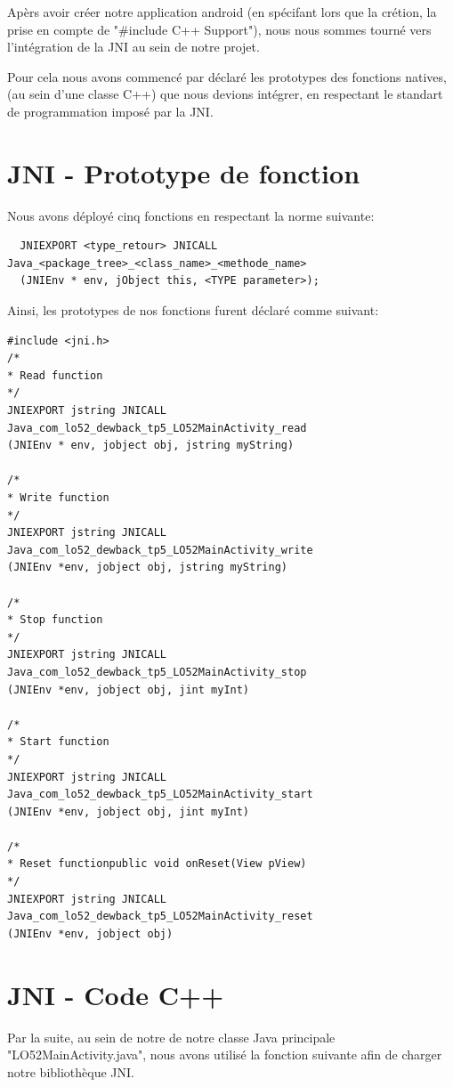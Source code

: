\documentclass[french,a4paper,12pt]{report}
\begin{document}
Apèrs avoir créer notre application android (en spécifant lors que la crétion,
la prise en compte de "#include C++ Support"), nous nous sommes tourné vers
l'intégration de la JNI au sein de notre projet.

Pour cela nous avons commencé par déclaré les prototypes des fonctions natives,
(au sein d'une classe C++) que nous devions intégrer, en respectant le standart
de programmation imposé par la JNI.

\section{JNI - Prototype de fonction}

Nous avons déployé cinq fonctions en respectant la norme suivante:

\begin{lstlisting}
  JNIEXPORT <type_retour> JNICALL Java_<package_tree>_<class_name>_<methode_name>
  (JNIEnv * env, jObject this, <TYPE parameter>);
\end{lstlisting}

Ainsi, les prototypes de nos fonctions furent déclaré comme suivant:

\begin{lstlisting}
#include <jni.h>
/*
* Read function
*/
JNIEXPORT jstring JNICALL Java_com_lo52_dewback_tp5_LO52MainActivity_read
(JNIEnv * env, jobject obj, jstring myString)

/*
* Write function
*/
JNIEXPORT jstring JNICALL Java_com_lo52_dewback_tp5_LO52MainActivity_write
(JNIEnv *env, jobject obj, jstring myString)

/*
* Stop function
*/
JNIEXPORT jstring JNICALL Java_com_lo52_dewback_tp5_LO52MainActivity_stop
(JNIEnv *env, jobject obj, jint myInt)

/*
* Start function
*/
JNIEXPORT jstring JNICALL Java_com_lo52_dewback_tp5_LO52MainActivity_start
(JNIEnv *env, jobject obj, jint myInt)

/*
* Reset functionpublic void onReset(View pView)
*/
JNIEXPORT jstring JNICALL Java_com_lo52_dewback_tp5_LO52MainActivity_reset
(JNIEnv *env, jobject obj)
\end{lstlisting}

\section{JNI - Code C++}

Par la suite,
au sein de notre de notre classe Java principale "LO52MainActivity.java", nous
avons utilisé la fonction suivante afin de charger notre bibliothèque JNI.
\end{document}
